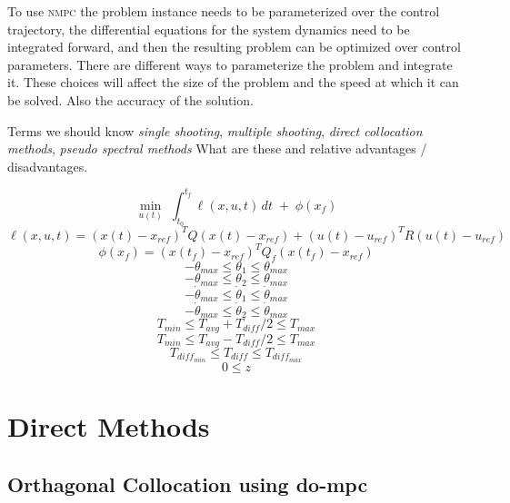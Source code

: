 \documentclass[]{article}
\newcommand{\nmpc}{\textsc{nmpc}}
\begin{document}
To use {\nmpc} the problem instance needs to be parameterized over the control trajectory, the differential equations for the system dynamics need to be integrated forward, and then the resulting problem can be optimized over control parameters. There are different ways to parameterize the problem and integrate it.  These choices will affect the size of the problem and the speed at which it can be solved. Also the accuracy of the solution.

Terms we should know {\em single shooting}, {\em multiple shooting}, {\em direct collocation methods}, {\em pseudo spectral methods} What are these and relative advantages / disadvantages.


        \[
        \min_{u(t)} \; \int_{t_0}^{t_f} \ell(x,u,t)\,dt \;+\; \phi(x_f)
        \]
        \[
	\ell(x,u,t) = (x(t)-x_{ref})^T Q (x(t)-x_{ref}) + (u(t)-u_{ref})^T R (u(t)-u_{ref}) 
        \]
        \[
	\phi(x_f) = (x(t_f)-x_{ref})^T Q_f (x(t_f)-x_{ref})
        \]
        \[
	-\theta_{max} \leq \theta_1 \leq \theta_{max}
        \]
        \[
	-\theta_{max} \leq \theta_2 \leq \theta_{max}
        \]
        \[
        	-\dot{\theta}_{max} \leq \dot{\theta}_1 \leq \dot{\theta}_{max}
        \]
        \[
        	-\dot{\theta}_{max} \leq \dot{\theta}_2 \leq \dot{\theta}_{max}
        \]
        \[
        	T_{min}  \leq T_{avg} + T_{diff}/2 \leq T_{max}
        \]
        \[
        T_{min} \leq  T_{avg} - T_{diff}/2 \leq T_{max}
        \]
        \[
        T_{diff_{min}} \leq T_{diff} \leq T_{diff_{max}}
        \]
        \[
        0 \leq z
        \]
        
\section{Direct Methods}
\subsection*{Orthagonal Collocation using {do-mpc}} 
\end{document}
